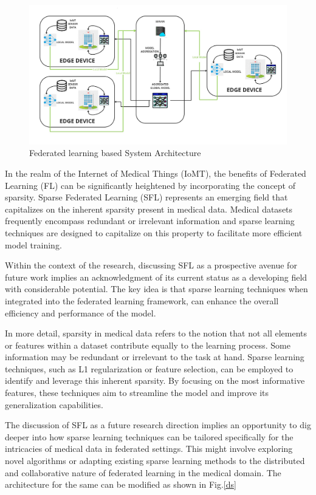 \documentclass[conference]{IEEEtran}
\begin{document}
\begin{figure}[htp]
    \centering
    \includegraphics[scale = 0.12]{FL_ARCHITECTURE (3).jpg}
    \caption{Federated learning based System Architecture}
    \label{dis}
\end{figure}

In the realm of the Internet of Medical Things (IoMT), the benefits of Federated Learning (FL) can be significantly heightened by incorporating the concept of sparsity. Sparse Federated Learning (SFL) represents an emerging field that capitalizes on the inherent sparsity present in medical data. Medical datasets frequently encompass redundant or irrelevant information and sparse learning techniques are designed to capitalize on this property to facilitate more efficient model training.

Within the context of the research, discussing SFL as a prospective avenue for future work implies an acknowledgment of its current status as a developing field with considerable potential. The key idea is that sparse learning techniques when integrated into the federated learning framework, can enhance the overall efficiency and performance of the model.

In more detail, sparsity in medical data refers to the notion that not all elements or features within a dataset contribute equally to the learning process. Some information may be redundant or irrelevant to the task at hand. Sparse learning techniques, such as L1 regularization or feature selection, can be employed to identify and leverage this inherent sparsity. By focusing on the most informative features, these techniques aim to streamline the model and improve its generalization capabilities.

The discussion of SFL as a future research direction implies an opportunity to dig deeper into how sparse learning techniques can be tailored specifically for the intricacies of medical data in federated settings. This might involve exploring novel algorithms or adapting existing sparse learning methods to the distributed and collaborative nature of federated learning in the medical domain. The architecture for the same can be modified as shown in Fig.\ref{ds}
\end{document}
